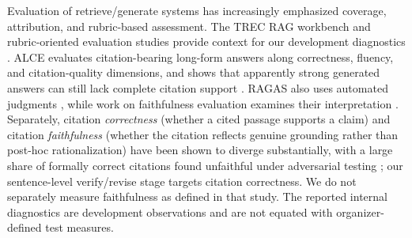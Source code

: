 Evaluation of retrieve/generate systems has increasingly emphasized
coverage, attribution, and rubric-based assessment. The TREC RAG
workbench and rubric-oriented evaluation studies provide context for
our development diagnostics \citep{dietz2024workbench,farzi2024pencils,pradeep2024initialnugget,pradeep2025greatnugget}.
ALCE evaluates citation-bearing long-form answers along correctness,
fluency, and citation-quality dimensions, and shows that apparently
strong generated answers can still lack complete citation support
\citep{gao2023alce}.
RAGAS also uses automated judgments \citep{es2024ragas}, while work on
faithfulness evaluation examines their interpretation
\citep{jing2025scale}. Separately, citation \emph{correctness} (whether
a cited passage supports a claim) and citation \emph{faithfulness}
(whether the citation reflects genuine grounding rather than
post-hoc rationalization) have been shown to diverge substantially,
with a large share of formally correct citations found unfaithful
under adversarial testing \citep{wallat2025correctness}; our
sentence-level verify/revise stage targets citation correctness. We do
not separately measure faithfulness as defined in that study. The
reported internal diagnostics are development observations and are not
equated with organizer-defined test measures.
